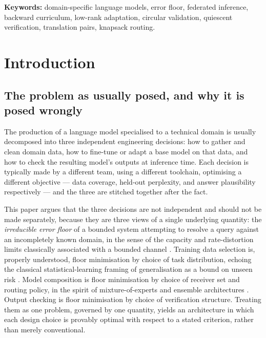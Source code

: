 \documentclass[11pt,twocolumn,a4paper]{article}
\theoremstyle{rdm}
\theoremstyle{definition}
\theoremstyle{remark}
\begin{document}
\vspace{4pt}
\noindent\textbf{Keywords:} domain-specific language models, error floor,
federated inference, backward curriculum, low-rank adaptation, circular
validation, quiescent verification, translation pairs, knapsack routing.

\tableofcontents

\section{Introduction}
\label{sec:intro}

\subsection{The problem as usually posed, and why it is posed wrongly}

The production of a language model specialised to a technical domain is
usually decomposed into three independent engineering decisions: how to
gather and clean domain data, how to fine-tune or adapt a base model on that
data, and how to check the resulting model's outputs at inference time. Each
decision is typically made by a different team, using a different toolchain,
optimising a different objective --- data coverage, held-out perplexity, and
answer plausibility respectively --- and the three are stitched together
after the fact.

This paper argues that the three decisions are not independent and should
not be made separately, because they are three views of a single underlying
quantity: the \emph{irreducible error floor} of a bounded system attempting
to resolve a query against an incompletely known domain, in the sense of the
capacity and rate-distortion limits classically associated with a bounded
channel \citep{shannon1948,kelly1956,cover2006}. Training data
selection is, properly understood, floor minimisation by choice of task
distribution, echoing the classical statistical-learning framing of
generalisation as a bound on unseen risk \citep{vapnik1998,valiant1984}.
Model composition is floor minimisation by choice of receiver
set and routing policy, in the spirit of mixture-of-experts and ensemble
architectures \citep{jacobs1991,dietterich2000,breiman2001,wolpert1992}.
Output checking is floor minimisation by choice of
verification structure. Treating them as one problem, governed by one
quantity, yields an architecture in which each design choice is provably
optimal with respect to a stated criterion, rather than merely conventional.
\end{document}
